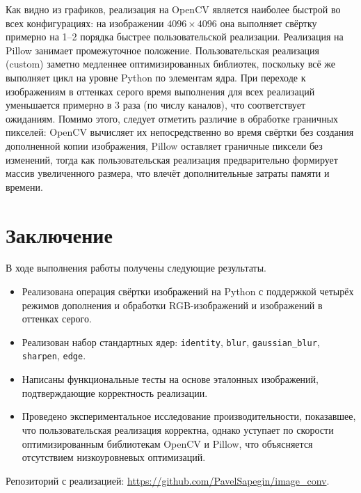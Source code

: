 \documentclass[a4paper]{article}
\begin{document}
Как видно из графиков, реализация на OpenCV является наиболее быстрой во всех конфигурациях: на изображении $4096\times4096$ она выполняет свёртку примерно на 1--2 порядка быстрее пользовательской реализации. Реализация на Pillow занимает промежуточное положение. 
Пользовательская реализация (custom) заметно медленнее оптимизированных библиотек, поскольку всё же выполняет цикл на уровне Python по элементам ядра. При переходе к изображениям в оттенках серого время выполнения для всех реализаций уменьшается примерно в 3 раза (по числу каналов), что соответствует ожиданиям.
Помимо этого, следует отметить различие в обработке граничных пикселей: OpenCV вычисляет их непосредственно во время свёртки без создания дополненной копии изображения, Pillow оставляет граничные пиксели без изменений, тогда как пользовательская реализация предварительно формирует массив увеличенного размера, что влечёт дополнительные затраты памяти и времени.
\section{Заключение}

В ходе выполнения работы получены следующие результаты.
\begin{itemize}
    \item Реализована операция свёртки изображений на Python с поддержкой четырёх режимов дополнения и обработки RGB-изображений и изображений в оттенках серого.
    \item Реализован набор стандартных ядер: \verb|identity|, \verb|blur|, \verb|gaussian_blur|, \verb|sharpen|, \verb|edge|.
    \item Написаны функциональные тесты на основе эталонных изображений, подтверждающие корректность реализации.
    \item Проведено экспериментальное исследование производительности, показавшее, что пользовательская реализация корректна, однако уступает по скорости оптимизированным библиотекам OpenCV и Pillow, что объясняется отсутствием низкоуровневых оптимизаций.
\end{itemize}

Репозиторий с реализацией: \url{https://github.com/PavelSapegin/image_conv}.
\end{document}
